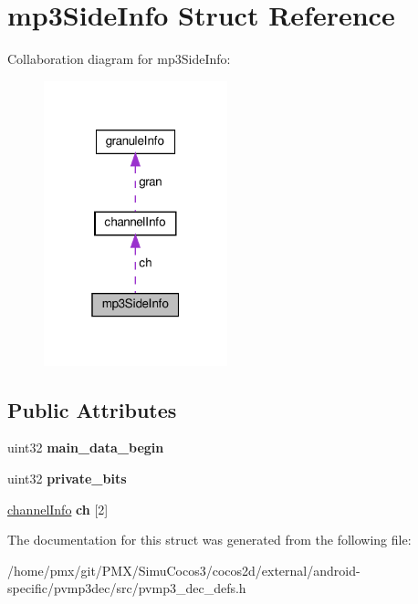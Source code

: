 \hypertarget{structmp3SideInfo}{}\section{mp3\+Side\+Info Struct Reference}
\label{structmp3SideInfo}


Collaboration diagram for mp3\+Side\+Info\+:
\nopagebreak
\begin{figure}[H]
\begin{center}
\leavevmode
\includegraphics[width=151pt]{structmp3SideInfo__coll__graph}
\end{center}
\end{figure}
\subsection*{Public Attributes}
\begin{DoxyCompactItemize}
\item 
\mbox{\label{structmp3SideInfo_a16c239a68969e414029cc7a014428bad}} 
uint32 {\bfseries main\+\_\+data\+\_\+begin}
\item 
\mbox{\label{structmp3SideInfo_a4ecacccac62ed2de352a189aab5d2d2a}} 
uint32 {\bfseries private\+\_\+bits}
\item 
\mbox{\label{structmp3SideInfo_ac3802f163f5bc22d06d64502049d4be7}} 
\hyperlink{structchannelInfo}{channel\+Info} {\bfseries ch} \mbox{[}2\mbox{]}
\end{DoxyCompactItemize}


The documentation for this struct was generated from the following file\+:\begin{DoxyCompactItemize}
\item 
/home/pmx/git/\+P\+M\+X/\+Simu\+Cocos3/cocos2d/external/android-\/specific/pvmp3dec/src/pvmp3\+\_\+dec\+\_\+defs.\+h\end{DoxyCompactItemize}
